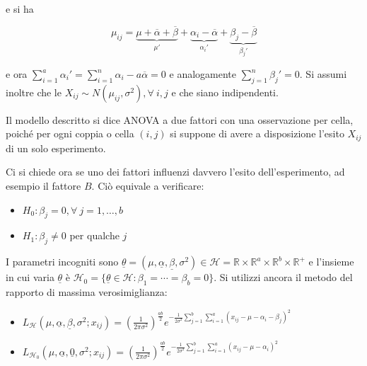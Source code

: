 \documentclass[hidelinks, 10pt]{report}
\begin{document}
e si ha

\[ \mu_{ij} = \underbrace{\mu + \overline{\alpha} + \overline{\beta}}_{\mu'} + \underbrace{\alpha_{i} - \overline{\alpha}}_{\alpha_{i}'} + \underbrace{\beta_{j} - \overline{\beta}}_{\beta_{j}'}  \]

e ora $ \sum\limits_{i = 1}^{a} \alpha_{i}' = \sum\limits_{i = 1}^{n} \alpha_{i} - a \overline{\alpha} = 0 $ e analogamente $ \sum\limits_{j = 1}^{n} \beta_{j}' = 0 $. Si assumi inoltre che le $ X_{ij} \sim N(\mu_{ij}, \sigma^{2}), \forall\ i, j $ e che siano indipendenti.

Il modello descritto si dice ANOVA a due fattori con una osservazione per cella, poich\'e per ogni coppia o cella $ (i, j) $ si suppone di avere a disposizione l'esito $ X_{ij} $ di un solo esperimento.

Ci si chiede ora se uno dei fattori influenzi davvero l'esito dell'esperimento, ad esempio il fattore $ B $. Ci\`o equivale a verificare:

\begin{itemize}
\item $ H_{0}: \beta_{j} = 0, \forall\ j = 1, \dotsc, b $
\item $ H_{1}: \beta_{j} \ne 0 $ per qualche $ j $
\end{itemize}

I parametri incogniti sono $ \underline{\theta} = (\mu, \underline{\alpha}, \underline{\beta}, \sigma^{2}) \in \mathcal{H} = \mathbb{R} \times \mathbb{R}^{a} \times \mathbb{R}^{b} \times \mathbb{R}^{+} $ e l'insieme in cui varia $ \underline{\theta} $ \`e $ \mathcal{H}_{0} = \{ \underline{\theta} \in \mathcal{H} : \beta_{1} = \dotsb = \beta_{b} = 0 \} $. Si utilizzi ancora il metodo del rapporto di massima verosimiglianza:

\begin{itemize}
\item $ L_{\mathcal{H}} (\mu, \underline{\alpha}, \underline{\beta}, \sigma^{2}; x_{ij}) = \left( \frac{1}{2 \pi \sigma^{2}} \right)^{\frac{ab}{2}} e^{- \frac{1}{2 \sigma^{2}} \sum\limits_{j = 1}^{b} \sum\limits_{i = 1}^{a} (x_{ij} - \mu - \alpha_{i} - \beta_{j})^{2}} $
\item $ L_{\mathcal{H}_{0}} (\mu, \underline{\alpha}, \underline{0}, \sigma^{2}; x_{ij}) = \left( \frac{1}{2 \pi \sigma^{2}} \right)^{\frac{ab}{2}} e^{- \frac{1}{2 \sigma^{2}} \sum\limits_{j = 1}^{b} \sum\limits_{i = 1}^{a} (x_{ij} - \mu - \alpha_{i})^{2}} $
\end{itemize}
\end{document}
